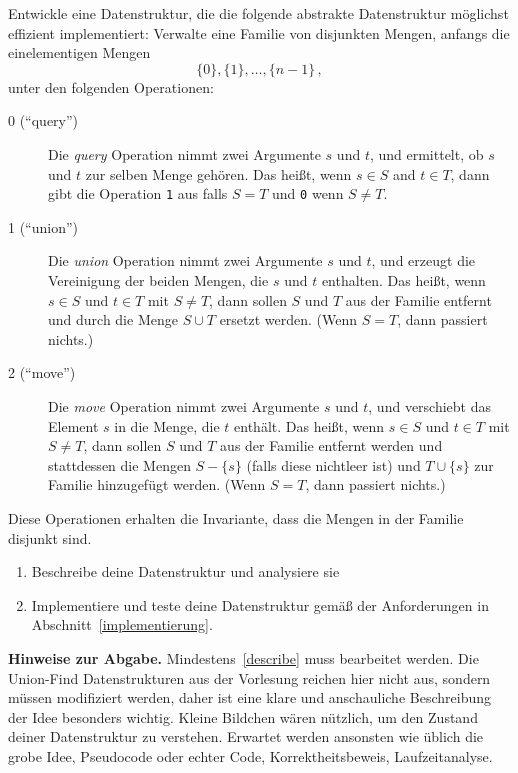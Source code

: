 \documentclass{uebung_cs}
\begin{document}
  Entwickle eine Datenstruktur, die die folgende abstrakte Datenstruktur möglichst effizient implementiert:
  Verwalte eine Familie von disjunkten Mengen, anfangs die einelementigen Mengen
  \[ \{0\},\{1\}, \ldots,\{n-1\}\,,\]
  unter den folgenden Operationen:
  \begin{description}
   \item[0 (\enquote{query})]
      Die \emph{query} Operation nimmt zwei Argumente $s$ und $t$, und ermittelt, ob $s$ und $t$ zur selben Menge gehören.
      Das heißt, wenn $s\in S$ and $t\in T$, dann gibt die Operation \texttt{1} aus falls $S=T$ und \texttt{0} wenn $S\neq T$.
    \item[1 (\enquote{union})]
    Die \emph{union} Operation nimmt zwei Argumente $s$ und $t$, und erzeugt die Vereinigung der beiden Mengen, die $s$ und $t$ enthalten.
    Das heißt, wenn $s\in S$ und $t\in T$ mit $S\neq T$, dann sollen $S$ und $T$ aus der Familie entfernt und durch die Menge $S\cup T$ ersetzt werden.
      (Wenn $S=T$, dann passiert nichts.)
    \item[2 (\enquote{move})]
      Die \emph{move} Operation nimmt zwei Argumente $s$ und $t$, und verschiebt das Element $s$ in die Menge, die $t$ enthält.
      Das heißt, wenn $s\in S$ und $t\in T$ mit $S\neq T$, dann sollen $S$ und $T$ aus der Familie entfernt werden und stattdessen die Mengen $S-\{s\}$ (falls diese nichtleer ist)  und $T\cup\{s\}$ zur Familie hinzugefügt werden.
      (Wenn $S= T$, dann passiert nichts.)
  \end{description}
  Diese Operationen erhalten die Invariante, dass die Mengen in der Familie disjunkt sind.
  
  \begin{enumerate}
    \item\label{describe} Beschreibe deine Datenstruktur und analysiere sie
    \item\label{implement} Implementiere und teste deine Datenstruktur gemäß der Anforderungen in Abschnitt~\ref{implementierung}.
  \end{enumerate}

  \textbf{Hinweise zur Abgabe.}
  Mindestens~\ref{describe} muss bearbeitet werden.
  Die Union-Find Datenstrukturen aus der Vorlesung reichen hier nicht aus, sondern müssen modifiziert werden, daher ist eine klare und anschauliche Beschreibung der Idee besonders wichtig. Kleine Bildchen wären nützlich, um den Zustand deiner Datenstruktur zu verstehen.
  Erwartet werden ansonsten wie üblich die grobe Idee, Pseudocode oder echter Code, Korrektheitsbeweis, Laufzeitanalyse.
\end{document}
